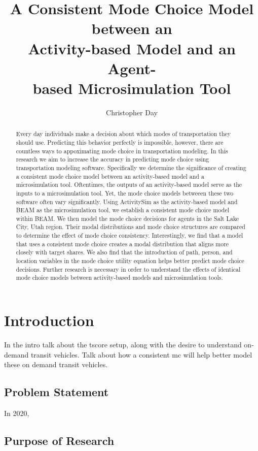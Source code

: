 \documentclass[12pt, oneside, openright]{byuthesis}
\title{A Consistent Mode Choice Model between an\\
Activity-based Model and an Agent-\\
based Microsimulation Tool}
\author{Christopher Day}
\begin{document}
\begin{abstract}
Every day individuals make a decision about which modes of transportation they should use. Predicting this behavior perfectly is impossible, however, there are countless ways to appoximating mode choice in transportation modeling. In this research we aim to increase the accuracy in predicting mode choice using transportation modeling software. Specifically we determine the significance of creating a consistent mode choice model between an activity-based model and a microsimulation tool. Oftentimes, the outputs of an activity-based model serve as the inputs to a microsimulation tool. Yet, the mode choice models betweeen these two software often vary significantly. Using ActivitySim as the activity-based model and BEAM as the microsimulation tool, we establish a consistent mode choice model within BEAM. We then model the mode choice decisions for agents in the Salt Lake City, Utah region. Their modal distributions and mode choice structures are compared to determine the effect of mode choice consistency. Interestingly, we find that a model that uses a consistent mode choice creates a modal distribution that aligns more closely with target shares. We also find that the introduction of path, person, and location variables in the mode choice utility equation helps better predict mode choice decisions. Further research is necessary in order to understand the effects of identical mode choice models between activity-based models and microsimulation tools.
\end{abstract}


\makefrontmatter %
\thesisbody

\hypertarget{introduction}{%
\chapter{Introduction}\label{introduction}}

In the intro talk about the tscore setup, along with the desire to understand on-demand transit vehicles. Talk about how a consistent mc will help better model these on demand transit vehicles.

\hypertarget{problem-statement}{%
\section{Problem Statement}\label{problem-statement}}

In 2020,

\hypertarget{purpose-of-research}{%
\section{Purpose of Research}\label{purpose-of-research}}
\end{document}
